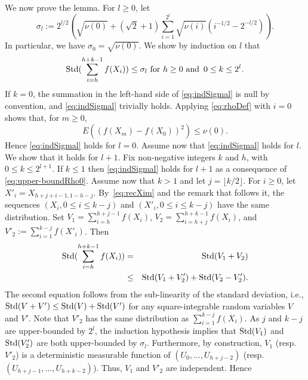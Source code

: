 \documentclass[a4paper,11pt]{article}
\begin{document}
We now prove the lemma. For \(l\geq 0\), let \begin{displaymath}
\sigma_{l}:=2^{l/2}\left( \sqrt{\nu(0)}+(\sqrt{2}+1)\sum^{2^{l}}_{i=1} \sqrt{\nu(i)}(i^{-1/2}-2^{-l/2})\right).
\end{displaymath}In particular, we have \(\sigma_{0}=\sqrt{\nu(0)}\). We show by induction on \(l\) that \begin{equation}\label{eq:indSigmal}
{\rm Std}(\sum ^{h+k-1}_{i=h}f(X_{i}))\le \sigma_{l} \text{ for }h\ge0\text{ and }\,0\leq k\leq2^{l}.
\end{equation} 
If \(k=0\), the summation in the left-hand side of    \eqref{eq:indSigmal} is null by convention, and     \eqref{eq:indSigmal} trivially holds.  Applying \eqref{eq:rhoDef} with \(i=0\) shows that, for \(m\ge 0\),
\begin{equation}\label{eq:upper-boundRho0}
E((f(X_{m})-f(X_{0}))^{2})\leq\nu(0).
\end{equation}Hence \eqref{eq:indSigmal} holds for \(l=0\). Assume now that  \eqref{eq:indSigmal} holds for \(l\). We show  that it holds for \(l+1\). Fix non-negative integers \(k\) and \(h\), with \(0\le k\leq2^{l+1}\). If \(k\leq1\) then   \eqref{eq:indSigmal} holds for \(l+1\) as a consequence of \eqref{eq:upper-boundRho0}. Assume now that \(k>1\) and let   \(j=\lfloor k/2\rfloor\).    For \(i\geq0\), let \(X'_{i}=X_{h+j+i-1,1-h-j}\). By~\eqref{eq:recXim}
and the remark that follows it,  the sequences \((X_{i},0\leq i\leq k-j)\) and \((X'_{i},0\leq i\leq k-j)\)  have the same distribution. Set
\(V_{1}=\sum^{{h+j-1}}_{i=h}f(X_{i})\), 
\(V_{2}=\sum^{{h+k-1}}_{i=h+j}f(X_{i})\), 
  and \(V'_{2}:=\sum ^{k-j}_{i=1}f(X'_{i})\). Then \begin{eqnarray}\label{eq:stdSummation}
{\rm Std}(\sum^{{h+k-1}}_{i=h}f(X_{i}))&=&{\rm Std}(V_{1}+V_{2})\nonumber\\
&\le&{\rm Std}(V_{1}+V'_{2})+{\rm Std}(V_{2}-V'_{2}).
\end{eqnarray}
The second equation follows from the sub-linearity of the standard deviation,
 i.e., \({\rm Std}(V+V')\le{\rm Std}(V)+{\rm Std}(V')\) for any square-integrable random variables \(V\) and \(V'\). Note that \(V'_{2}\)  has the same distribution as \(\sum ^{k-j}_{i=1}f(X_{i})\).   As \(j\) and \(k-j\) are upper-bounded by \(2^{l}\), the induction hypothesis implies that \({\rm Std}(V_{1})\) and  \({\rm Std}(V'_{2})\) are both upper-bounded by \(\sigma_{l}\).  Furthermore,
by construction,  \(V_{1}\) (resp. \(V'_{2}\))
 is a deterministic measurable function of \((U_{0},\dots,U_{h+j-2})\) (resp.
 \((U_{h+j-1},\dots,U_{h+k-2})\)). Thus, \(V_{1}\) and \(V'_{2}\)  are independent. Hence
\end{document}
